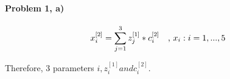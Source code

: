 \documentclass[11pt]{article}
\begin{document}
\MakeScribeTop


\paragraph{\noindent\textbf{\LARGE{Problem 1, a)}}}

\begin{equation*}
\begin{split}
    x_i^{[2]} = \sum_{j=1}^3 z_j^{[1]} * c_i^{[2]}  \text{\quad , $x_i : i = 1, ..., 5$}
\end{split}
\end{equation*}
\begin{flushleft}
    Therefore, 3 parameters $i , z_i^{[1]} and c_i^{[2]}$.
\end{flushleft} 
\end{document}
